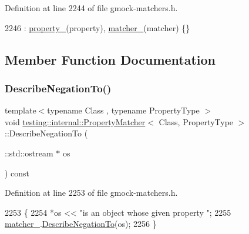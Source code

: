 Definition at line 2244 of file gmock-\/matchers.\+h.


\begin{DoxyCode}
2246       : \hyperlink{classtesting_1_1internal_1_1PropertyMatcher_a3c7a303b73d6130ba775932a7c26b92d}{property\_}(property), \hyperlink{classtesting_1_1internal_1_1PropertyMatcher_af7733557fde1558190ab9c63d23f1305}{matcher\_}(matcher) \{\}
\end{DoxyCode}


\subsection{Member Function Documentation}
\mbox{\label{classtesting_1_1internal_1_1PropertyMatcher_a2e1bc9f89f253eaa609722f39f8e6239}} 
\subsubsection{\texorpdfstring{Describe\+Negation\+To()}{DescribeNegationTo()}}
{\footnotesize\ttfamily template$<$typename Class , typename Property\+Type $>$ \\
void \hyperlink{classtesting_1_1internal_1_1PropertyMatcher}{testing\+::internal\+::\+Property\+Matcher}$<$ Class, Property\+Type $>$\+::Describe\+Negation\+To (\begin{DoxyParamCaption}\item[{\+::std\+::ostream $\ast$}]{os }\end{DoxyParamCaption}) const\hspace{0.3cm}{\ttfamily [inline]}}



Definition at line 2253 of file gmock-\/matchers.\+h.


\begin{DoxyCode}
2253                                                 \{
2254     *os << \textcolor{stringliteral}{"is an object whose given property "};
2255     \hyperlink{classtesting_1_1internal_1_1PropertyMatcher_af7733557fde1558190ab9c63d23f1305}{matcher\_}.\hyperlink{classtesting_1_1internal_1_1MatcherBase_ac1089d49b6b8a381900618985cd69b7f}{DescribeNegationTo}(os);
2256   \}
\end{DoxyCode}
\mbox{\label{classtesting_1_1internal_1_1PropertyMatcher_a075fb69f9bac8024983ab07648b8e671}} 
